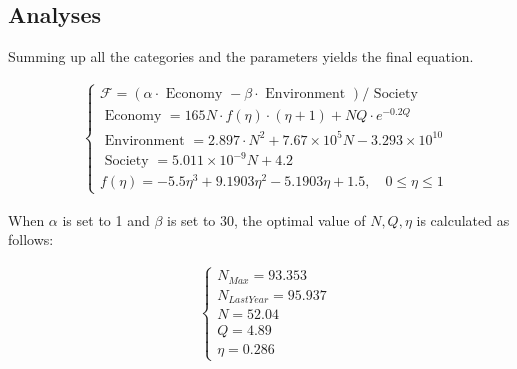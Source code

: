 
\subsection{Analyses}

Summing up all the categories and the parameters yields the final equation.

\begin{equation}
    \begin{aligned}
    &\left\{\begin{array}{l}
    \mathcal{F}=(\alpha \cdot \text { Economy }-\beta \cdot \text { Environment }) / \text { Society } \\[10pt]
    \text { Economy }=165 N \cdot f(\eta) \cdot (\eta+1)+NQ\cdot e^{-0.2 Q} \\[10pt]
    \text { Environment }=2.897 \cdot N^2+ 7.67\times 10^5 N- 3.293\times 10^{10} \\[10pt]
    \text { Society }=5.011\times 10^{-9} N + 4.2 \\[10pt]
    f(\eta)=-5.5 \eta^3+9.1903 \eta^2-5.1903 \eta+1.5, \quad 0 \leq \eta \leq 1
    \end{array}\right.
    \end{aligned}
\end{equation}

When $\alpha$ is set to 1 and $\beta$ is set to 30, 
the optimal value of $N,Q,\eta$ is calculated as follows:

\begin{equation}
    \begin{aligned}
    &\left\{\begin{array}{l}
    N_{Max} = 93.353 \\[10pt]
    N_{LastYear} = 95.937 \\[10pt]
    N=52.04 \\[10pt]
    Q=4.89 \\[10pt]
    \eta=0.286
    \end{array}\right.
    \end{aligned}
\end{equation}

